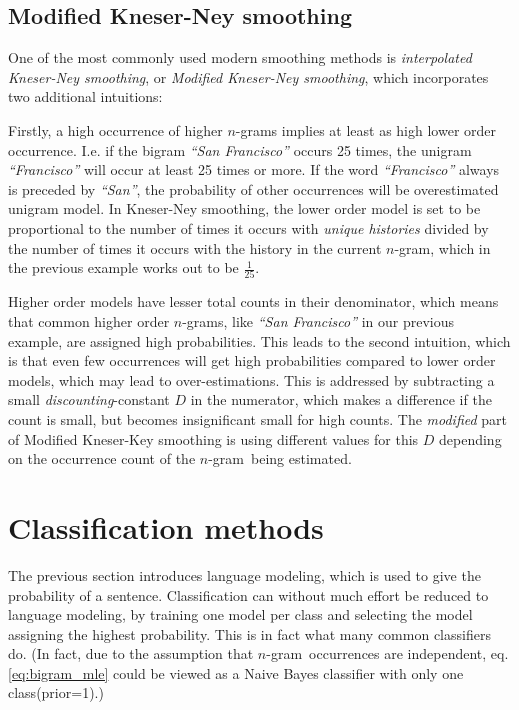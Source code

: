 \documentclass[a4paper,11pt]{kth-mag}
\newcommand{\ngram}{$n$-gram}
\begin{document}
\subsection{Modified Kneser-Ney smoothing}
One of the most commonly used modern smoothing methods is \emph{interpolated Kneser-Ney smoothing},
or \emph{Modified Kneser-Ney smoothing}\cite{nlp_book}, which incorporates two additional intuitions:

Firstly, a high occurrence of higher \ngram s implies at least as high
lower order occurrence. I.e. if the bigram \emph{``San Francisco''} occurs 25 times,
the unigram \emph{``Francisco''} will occur at least 25 times or more.
If the word \emph{``Francisco''} always is preceded by  \emph{``San''},
the probability of other occurrences will be overestimated unigram model.
In Kneser-Ney smoothing, the lower order model is set to be proportional to the
number of times it occurs with \emph{unique histories} divided by the number of times it
occurs with the history in the current \ngram\cite{chen_goodman}, which  in the previous example
works out to be $\frac{1}{25}$.

Higher order models have lesser total counts in their denominator, which means that common
higher order \ngram s, like \emph{``San Francisco''} in our previous example, are assigned high probabilities.
This leads to the second intuition, which is that even few occurrences will
get high probabilities compared to lower order models, which may lead to over-estimations.
This is addressed by subtracting a small \emph{discounting}-constant $D$ in the numerator,
which makes a difference if the count is small, but becomes insignificant small for high counts.
The \emph{modified} part of Modified Kneser-Key smoothing is using different values for this
$D$ depending on the occurrence count of the \ngram~being estimated\cite{chen_goodman}.


\section{Classification methods}
The previous section introduces language modeling, which is used to give the probability of a sentence.
Classification can without much effort be reduced to language modeling, by training one model per class and
selecting the model assigning the highest probability. This is in fact what many common classifiers do.
(In fact, due to the assumption that \ngram~occurrences are independent, eq. \ref {eq:bigram_mle}
could be viewed as a Naive Bayes classifier with only one class(prior=1).)
\end{document}
